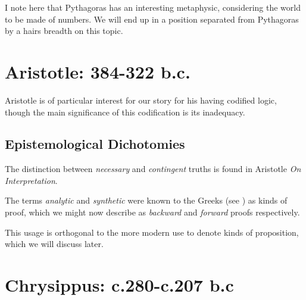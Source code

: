 
I note here that Pythagoras has an interesting metaphysic, considering the world to be made of numbers.
We will end up in a position separated from Pythagoras by a hairs breadth on this topic.









\section{Aristotle: 384-322 b.c.}

Aristotle is of particular interest for our story for his having codified logic, though the main significance of this codification is its inadequacy.

\subsection{Epistemological Dichotomies}

The distinction between {\it necessary} and {\it contingent} truths is found in Aristotle {\it On Interpretation}.

The terms {\it analytic} and {\it synthetic} were known to the Greeks (see \cite{euclidEL1}) as kinds of proof, which we might now describe as {\it backward} and {\it forward} proofs respectively.

This usage is orthogonal to the more modern use to denote kinds of proposition, which we will discuss later.


\section{Chrysippus: c.280-c.207 b.c}

